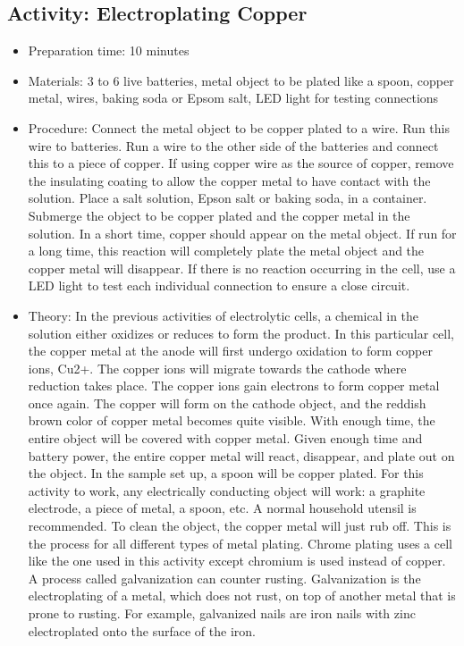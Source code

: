 \begin{itemize}
{\begin{itemize}
\subsection{Activity: Electroplating Copper}
\begin{itemize}
\item{Preparation time: 10 minutes}
\item{Materials: 3 to 6 live batteries, metal object to be plated like a spoon, copper metal, wires, baking soda or Epsom salt, LED light for testing connections}
\item{Procedure: Connect the metal object to be copper plated to a wire. Run this wire to batteries. Run a wire to the other side of the batteries and connect this to a piece of copper. If using copper wire as the source of copper, remove the insulating coating to allow the copper metal to have contact with the solution. Place a salt solution, Epson salt or baking soda, in a container. Submerge the object to be copper plated and the copper metal in the solution. In a short time, copper should appear on the metal object. If run for a long time, this reaction will completely plate the metal object and the copper metal will disappear. If there is no reaction occurring in the cell, use a LED light to test each individual connection to ensure a close circuit.}
\item{Theory: In the previous activities of electrolytic cells, a chemical in the solution either oxidizes or reduces to form the product. In this particular cell, the copper metal at the anode will first undergo oxidation to form copper ions, Cu2+. The copper ions will migrate towards the cathode where reduction takes place. The copper ions gain electrons to form copper metal once again. The copper will form on the cathode object, and the reddish brown color of copper metal becomes quite visible. With enough time, the entire object will be covered with copper metal. Given enough time and battery power, the entire copper metal will react, disappear, and plate out on the object. In the sample set up, a spoon will be copper plated. For this activity to work, any electrically conducting object will work: a graphite electrode, a piece of metal, a spoon, etc. A normal household utensil is recommended. To clean the object, the copper metal will just rub off. This is the process for all different types of metal plating. Chrome plating uses a cell like the one used in this activity except chromium is used instead of copper. A process called galvanization can counter rusting. Galvanization is the electroplating of a metal, which does not rust, on top of another metal that is prone to rusting. For example, galvanized nails are iron nails with zinc electroplated onto the surface of the iron.}
\end{itemize}


\end{itemize}}
\end{itemize}
